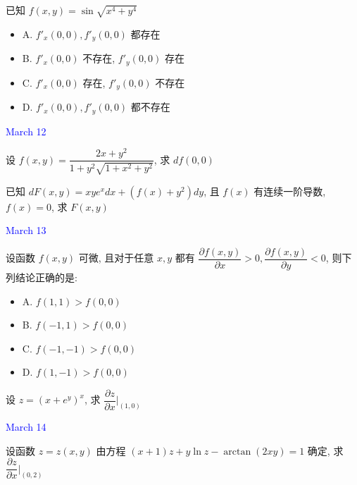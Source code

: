 \begin{example}[][Exam: 29.2.8]
	已知 $f(x,y)=\sin\sqrt{x^{4}+y^{4}}$
\begin{itemize}
	\item A. $f'_{x}(0,0),f'_{y}(0,0)$ 都存在
	\item B. $f'_{x}(0,0)$ 不存在, $f'_{y}(0,0)$ 存在
	\item C. $f'_{x}(0,0)$ 存在, $f'_{y}(0,0)$ 不存在
	\item D. $f'_{x}(0,0),f'_{y}(0,0)$ 都不存在
\end{itemize}
\end{example}

\textcolor{blue}{March 12}

\begin{example}[][Exam: 29.2.9]
	设 $f(x,y)=\dfrac{2x+y^{2}}{1+y^{2}\sqrt{1+x^{2}+y^{2}}}$, 求 $d f(0,0)$
\end{example}

\begin{example}[][Exam: 29.2.10]
	已知 $dF(x,y)=xye^{x}dx+(f(x)+y^{2})dy$, 且 $f(x)$ 有连续一阶导数, $f(x)=0$, 求 $F(x,y)$
\end{example}

\textcolor{blue}{March 13}

\begin{example}[][Exam: 29.2.11]
	设函数 $f(x,y)$ 可微, 且对于任意 $x,y$ 都有 $\dfrac{\partial f(x,y)}{\partial x}>0,\dfrac{\partial f(x,y)}{\partial y}<0$, 则下列结论正确的是:
\begin{itemize}
	\item A. $f(1,1)>f(0,0)$
	\item B. $f(-1,1)>f(0,0)$
	\item C. $f(-1,-1)>f(0,0)$
	\item D. $f(1,-1)>f(0,0)$
\end{itemize}
\end{example}

\begin{example}[][Exam: 29.2.12]
	设 $z=(x+e^{y})^{x}$, 求 $\dfrac{\partial z}{\partial x}\big|_{(1,0)}$
\end{example}

\textcolor{blue}{March 14}

\begin{example}[][Exam: 29.2.13]
	设函数 $z=z(x,y)$ 由方程 $(x+1)z+y\ln z-\arctan(2xy)=1$ 确定, 
	求$\dfrac{\partial z}{\partial x}\big|_{(0,2)}$
\end{example}

